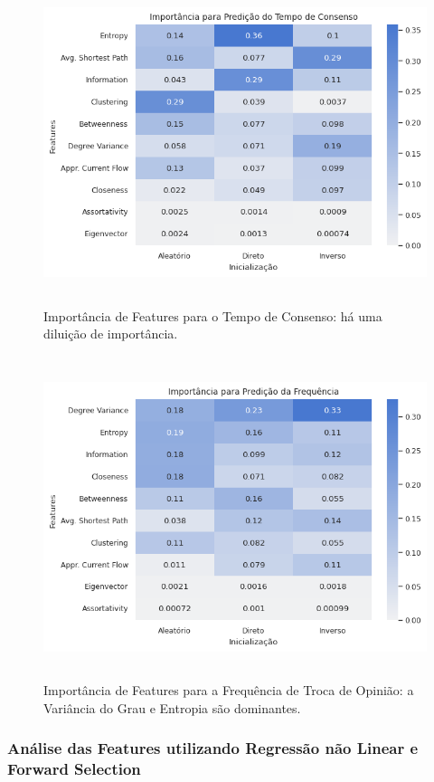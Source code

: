 \begin{figure}
\centering
\includegraphics[width=\textwidth,height=3.70833in]{consensus_importance.png}
\caption{Importância de Features para o Tempo de Consenso: há uma
diluição de importância. \label{teste}}
\end{figure}

\begin{figure}
\centering
\includegraphics[width=\textwidth,height=3.70833in]{frequency_importance.png}
\caption{Importância de Features para a Frequência de Troca de Opinião:
a Variância do Grau e Entropia são dominantes.}
\end{figure}

\subsubsection{Análise das Features utilizando Regressão não Linear e
Forward
Selection}\label{anuxe1lise-das-features-utilizando-regressuxe3o-nuxe3o-linear-e-forward-selection}

